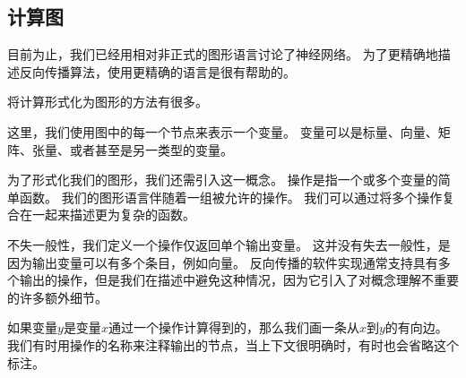 \subsection{计算图}
\label{sec:computational_graphs}

目前为止，我们已经用相对非正式的图形语言讨论了神经网络。
为了更精确地描述反向传播算法，使用更精确的语言是很有帮助的。

将计算形式化为图形的方法有很多。

这里，我们使用图中的每一个节点来表示一个变量。
变量可以是标量、向量、矩阵、张量、或者甚至是另一类型的变量。

为了形式化我们的图形，我们还需引入这一概念。
操作是指一个或多个变量的简单函数。
我们的图形语言伴随着一组被允许的操作。
我们可以通过将多个操作复合在一起来描述更为复杂的函数。


不失一般性，我们定义一个操作仅返回单个输出变量。
这并没有失去一般性，是因为输出变量可以有多个条目，例如向量。
反向传播的软件实现通常支持具有多个输出的操作，但是我们在描述中避免这种情况，因为它引入了对概念理解不重要的许多额外细节。

如果变量$y$是变量$x$通过一个操作计算得到的，那么我们画一条从$x$到$y$的有向边。
我们有时用操作的名称来注释输出的节点，当上下文很明确时，有时也会省略这个标注。

